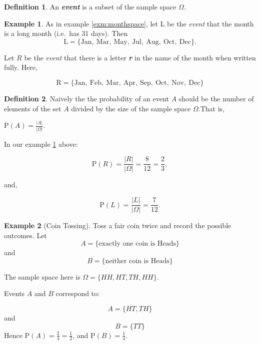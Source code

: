 \documentclass[
]{book}
\theoremstyle{definition}
\newtheorem{definition}{Definition}[chapter]
\theoremstyle{definition}
\newtheorem{example}{Example}[chapter]
\theoremstyle{definition}
\theoremstyle{definition}
\theoremstyle{remark}
\begin{document}
\begin{definition}
\protect\hypertarget{def:event}{}\label{def:event}An \textbf{\emph{event}} is a subset of the sample space \(\Omega\).
\end{definition}

\begin{example}
\protect\hypertarget{exm:landr}{}\label{exm:landr}As in example \ref{exm:monthspace}, let \(\text{L}\) be the \emph{event} that the month is a long month (i.e.~has 31 days). Then
\[\text{L} = \{\text{Jan}, \ \text{Mar}, \ \text{May},  \ \text{Jul}, \ \text{Aug},  \ \text{Oct}, \ \text{Dec} \}.\]

Let \(R\) be the \emph{event} that there is a letter \textbf{\emph{r}} in the name of the month when written fully. Here,

\[\text{R} = \{\text{Jan}, \ \text{Feb}, \ \text{Mar}, \ \text{Apr},  \ \text{Sep}, \ \text{Oct}, \ \text{Nov}, \  \text{Dec} \}\]
\end{example}

\begin{definition}
\protect\hypertarget{def:naiveprob}{}\label{def:naiveprob}Naively the the probability of an event \(A\) should be the number of elements of the set \(A\) divided by the size of the sample space \(\Omega\).That is,

\(\text{P} (A) = \frac{|A|}{|\Omega|}\).
\end{definition}

In our example \ref{exm:landr} above:

\[\text{P}(R) = \frac{|R|}{|\Omega|} = \frac{8}{12} = \frac{2}{3},\]

and,

\[\text{P}(L) = \frac{|L|}{|\Omega|} =\frac{7}{12}.\]

\begin{example}[Coin Tossing]
Toss a fair coin twice and record the possible outcomes. Let
\[A = \{\text{exactly one coin is Heads}\}\]
and
\[B = \{\text{neither coin is Heads}\}\]

The sample space here is \(\Omega = \{HH, HT, TH, HH\}\).

Events \(A\) and \(B\) correspond to:

\[A = \{HT, TH\}\]
and
\[B = \{ TT \}\]
Hence \(\text{P}(A) = \frac{2}{4} = \frac{1}{2}\), and \(\text{P}(B)=\frac{1}{4}\).
\end{example}
\end{document}

